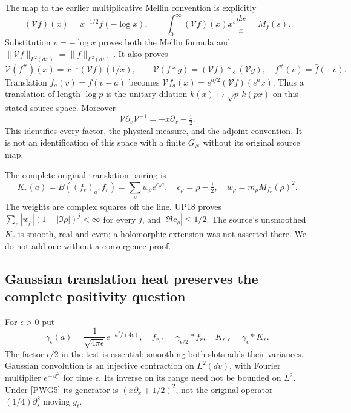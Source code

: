 The map to the earlier multiplicative Mellin convention is explicitly
\begin{equation}
 (\mathcal Vf)(x)=x^{-1/2}f(-\log x),\qquad
 \int_0^\infty(\mathcal Vf)(x)x^s\frac{dx}{x}=M_f(s).
                                                               \tag{PWG4}\label{PWG4}
\end{equation}
Substitution $v=-\log x$ proves both the Mellin formula and
$\|\mathcal Vf\|_{L^2(dx)}=\|f\|_{L^2(dv)}$.
It also proves
\[
 \mathcal V(f^\#)(x)=x^{-1}\overline{(\mathcal Vf)(1/x)},\qquad
 \mathcal V(f*g)=(\mathcal Vf)*_\times(\mathcal Vg),
 \quad f^\#(v)=\bar f(-v).
\]
Translation $f_a(v)=f(v-a)$ becomes
$\mathcal V f_a(x)=e^{a/2}(\mathcal Vf)(e^ax)$. Thus a translation of length $\log p$ is the unitary dilation $k(x)\mapsto\sqrt p\,k(px)$ on this stated source space. Moreover
\begin{equation}
 \mathcal V\partial_v\mathcal V^{-1}=-x\partial_x-\tfrac12.
                                                               \tag{PWG5}\label{PWG5}
\end{equation}
This identifies every factor, the physical measure, and the adjoint convention. It is not an identification of this space with a finite $G_N$ without its original source map.

The complete original translation pairing is
\begin{equation}
 K_r(a)=B((f_r)_a,f_r)
       =\sum_\rho w_\rho e^{c_\rho a},\quad
 c_\rho=\rho-\tfrac12,\quad
 w_\rho=m_\rho M_{f_r}(\rho)^2.                              \tag{PWG6}\label{PWG6}
\end{equation}
The weights are complex squares off the line. UP18 proves
$\sum_\rho|w_\rho|(1+|\Im\rho|)^j<\infty$ for every $j$, and
$|\Re c_\rho|\le1/2$. The source's unsmoothed $K_r$ is smooth, real and even; a holomorphic extension was not asserted there. We do not add one without a convergence proof.

\subsection{Gaussian translation heat preserves the complete positivity question}
For $\epsilon>0$ put
\begin{equation}
 \gamma_\epsilon(a)=\frac1{\sqrt{4\pi\epsilon}}e^{-a^2/(4\epsilon)},
 \quad f_{r,\epsilon}=\gamma_{\epsilon/2}*f_r,
 \quad K_{r,\epsilon}=\gamma_\epsilon*K_r.                  \tag{PWG7}\label{PWG7}
\end{equation}
The factor $\epsilon/2$ in the test is essential: smoothing both slots adds their variances. Gaussian convolution is an injective contraction on $L^2(dv)$, with Fourier multiplier $e^{-\epsilon\xi^2}$ for time $\epsilon$. Its inverse on its range need not be bounded on $L^2$. Under \eqref{PWG5} its generator is $(x\partial_x+1/2)^2$, not the original operator $(1/4)\partial_s^2$ moving $g_t$.

